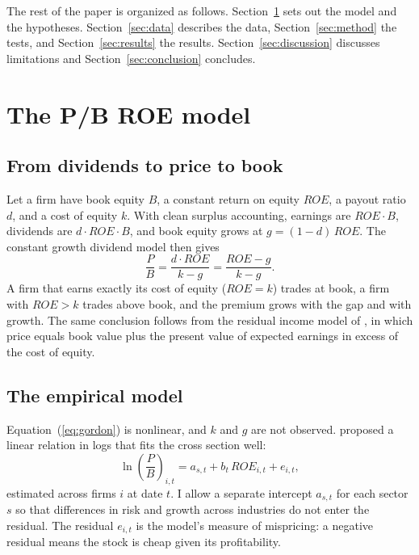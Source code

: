 \documentclass[11pt]{article}
\begin{document}
The rest of the paper is organized as follows. Section~\ref{sec:model} sets out the model and the
hypotheses. Section~\ref{sec:data} describes the data, Section~\ref{sec:method} the tests, and
Section~\ref{sec:results} the results. Section~\ref{sec:discussion} discusses limitations and
Section~\ref{sec:conclusion} concludes.

\section{The P/B ROE model}\label{sec:model}

\subsection{From dividends to price to book}

Let a firm have book equity $B$, a constant return on equity $ROE$, a payout ratio $d$, and a cost
of equity $k$. With clean surplus accounting, earnings are $ROE \cdot B$, dividends are
$d \cdot ROE \cdot B$, and book equity grows at $g = (1-d)\,ROE$. The constant growth dividend model
then gives
\begin{equation}
\frac{P}{B} = \frac{d \cdot ROE}{k - g} = \frac{ROE - g}{k - g}.
\label{eq:gordon}
\end{equation}
A firm that earns exactly its cost of equity ($ROE = k$) trades at book, a firm with $ROE > k$
trades above book, and the premium grows with the gap and with growth. The same conclusion follows
from the residual income model of \citet{ohlson1995}, in which price equals book value plus the
present value of expected earnings in excess of the cost of equity.

\subsection{The empirical model}

Equation~(\ref{eq:gordon}) is nonlinear, and $k$ and $g$ are not observed. \citet{wilcox1984}
proposed a linear relation in logs that fits the cross section well:
\begin{equation}
\ln\!\left(\frac{P}{B}\right)_{i,t} = a_{s,t} + b_t\, ROE_{i,t} + e_{i,t},
\label{eq:wilcox}
\end{equation}
estimated across firms $i$ at date $t$. I allow a separate intercept $a_{s,t}$ for each sector $s$ so
that differences in risk and growth across industries do not enter the residual. The residual
$e_{i,t}$ is the model's measure of mispricing: a negative residual means the stock is cheap given
its profitability.
\end{document}
